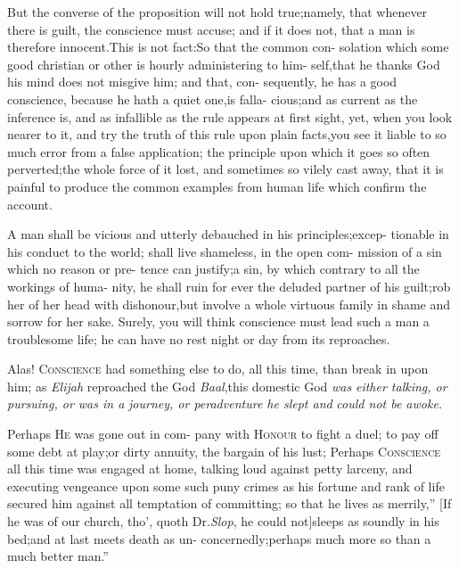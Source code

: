 \documentclass{article}
\begin{document}
\lqq But the converse of the proposition\break
\lqq will not hold true;\tsh namely, that\break
\lqq whenever there is guilt, the conscience\break
\lqq must accuse; and if it does not, that\break
\lqq a man is therefore innocent.\tsk This is\break
\lqq not fact:\tsk So that the common con-\break
\lqq solation which some good christian or\break
\lqq other is hourly administering to him-\break
\lqq self,\tsk that he thanks God his mind\break
\lqq does not misgive him; and that, con-
\lqq sequently, he has a good conscience,\break
\lqq because he hath a quiet one,\tsk is falla-\break
\lqq cious;\tsk and as current as the inference\break
\lqq is, and as infallible as the rule appears\break
\lqq at first sight, yet, when you look nearer\break
\lqq to it, and try the truth of this rule\break
\lqq upon plain facts,\tsk you see it liable to\break
\lqq so much error from a false application;\break
\lqq \tsk the principle upon which it goes so\break
\lqq often perverted;\tsk the whole force of\break
\lqq it lost, and sometimes so vilely cast\break
\lqq away, that it is painful to produce the\break
\lqq common examples from human life\break
\lqq which confirm the account.

\lqq A man shall be vicious and utterly\break
\lqq debauched in his principles;\tsk excep-\break
\lqq tionable in his conduct to the world;\break
\lqq shall live shameless, in the open com-\break
\lqq mission of a sin which no reason or pre-\break
\lqq tence can justify;\tsk a sin, by which
\lqq contrary to all the workings of huma-\break
\lqq nity, he shall ruin for ever the deluded\break
\lqq partner of his guilt;\tsk rob her of her\break
{}\break
\lqq head with dishonour,\tsk but involve a\break
\lqq whole virtuous family in shame and\break
\lqq sorrow for her sake. Surely, you will\break
\lqq think conscience must lead such a man\break
\lqq a troublesome life; he can have no\break
\lqq rest night or day from its reproaches.

\lqq Alas! \textsc{Conscience} had something\break
\lqq else to do, all this time, than break in\break
\lqq upon him; as \textit{Elijah} reproached the\break
\lqq God \textit{Baal},\tsh this domestic God \textit{was}\break
\lqq \textit{either talking, or pursuing, or was in a}\break
\lqq \textit{journey, or peradventure he slept and}\break
\lqq \textit{could not be awoke.}

\lqq Perhaps \textsc{He} was gone out in com-\break
\lqq pany with \textsc{Honour} to fight a duel;
\lqq to pay off some debt at play;\tsh or\break
\lqq dirty annuity, the bargain of his lust;\break
\lqq Perhaps \textsc{Conscience} all this time was\break
\lqq engaged at home, talking loud against\break
\lqq petty larceny, and executing vengeance\break
\lqq upon some such puny crimes as his\break
\lqq fortune and rank of life secured him\break
\lqq against all temptation of committing;\break
\lqq so that he lives as merrily,” [If he was\break
of our church, tho’, quoth Dr.\@ \textit{Slop}, he\break
could not]\tsk \lqq sleeps as soundly in his\break
\lqq bed;\tsk and at last meets death as un-\break
\lqq concernedly;\tsk perhaps much more so\break
\lqq than a much better man.”
\end{document}
